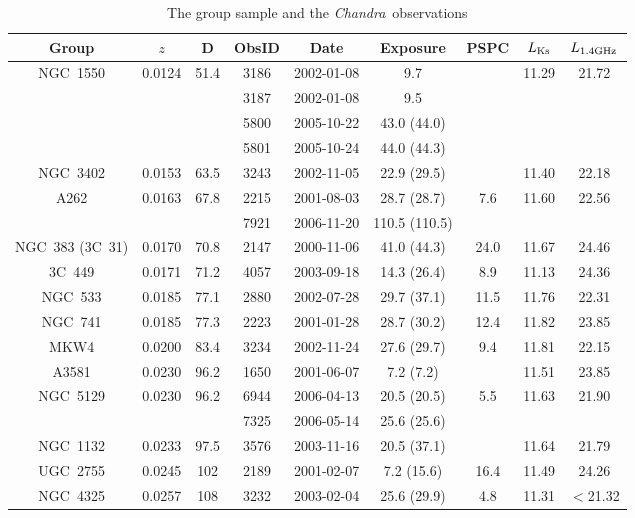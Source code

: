\documentclass{aastex}
\def\chandra    {{\em Chandra}\/}
\begin{document}
\begin{table} 
\begin{center}
\caption{The group sample and the \chandra\ observations}
{\scriptsize
\begin{tabular}{ccccccccc} \hline \hline
Group &  $z$\tablenotemark{a} & D\tablenotemark{b} & ObsID\tablenotemark{c} & Date & Exposure\tablenotemark{d} & PSPC\tablenotemark{e} & $L_{\rm Ks}$\tablenotemark{f} & $L_{\rm 1.4 GHz}$\tablenotemark{g} \\ \hline
 
NGC~1550 & 0.0124 & 51.4 & 3186 & 2002-01-08 & 9.7 & & 11.29 & 21.72 \\
         &        &      & 3187 & 2002-01-08 & 9.5 & & & \\
         &        &      & 5800 & 2005-10-22 & 43.0 (44.0) & & & \\
         &        &      & 5801 & 2005-10-24 & 44.0 (44.3) & & & \\
NGC~3402 & 0.0153 & 63.5 & 3243 & 2002-11-05 & 22.9 (29.5) & & 11.40 & 22.18 \\
A262     & 0.0163 & 67.8 & 2215 & 2001-08-03 & 28.7 (28.7) & 7.6 & 11.60 & 22.56 \\
         &        &      & 7921 & 2006-11-20 & 110.5 (110.5) & & & \\  
NGC~383 (3C~31) & 0.0170 & 70.8 & 2147 & 2000-11-06 & 41.0 (44.3) & 24.0 & 11.67 & 24.46 \\
3C~449   & 0.0171 & 71.2 & 4057 & 2003-09-18 & 14.3 (26.4) & 8.9 & 11.13 & 24.36 \\
NGC~533  & 0.0185 & 77.1 & 2880 & 2002-07-28 & 29.7 (37.1) & 11.5 & 11.76 & 22.31 \\
NGC~741  & 0.0185 & 77.3 & 2223 & 2001-01-28 & 28.7 (30.2) & 12.4 & 11.82 & 23.85 \\
MKW4     & 0.0200 & 83.4 & 3234 & 2002-11-24 & 27.6 (29.7) & 9.4 & 11.81 & 22.15 \\
A3581    & 0.0230 & 96.2 & 1650 & 2001-06-07 & 7.2 (7.2) & & 11.51 & 23.85 \\
NGC~5129 & 0.0230 & 96.2 & 6944 & 2006-04-13 & 20.5 (20.5) & 5.5 & 11.63 & 21.90 \\
         &        &      & 7325 & 2006-05-14 & 25.6 (25.6) & & & \\
NGC~1132 & 0.0233 & 97.5 & 3576 & 2003-11-16 & 20.5 (37.1) & & 11.64 & 21.79 \\
UGC~2755 & 0.0245 & 102 & 2189 & 2001-02-07 & 7.2 (15.6) & 16.4 & 11.49 & 24.26 \\
NGC~4325 & 0.0257 & 108 & 3232 & 2003-02-04 & 25.6 (29.9) & 4.8 & 11.31 & $<$21.32 \\

\end{tabular}}
\end{center}
\end{table}
\end{document}
